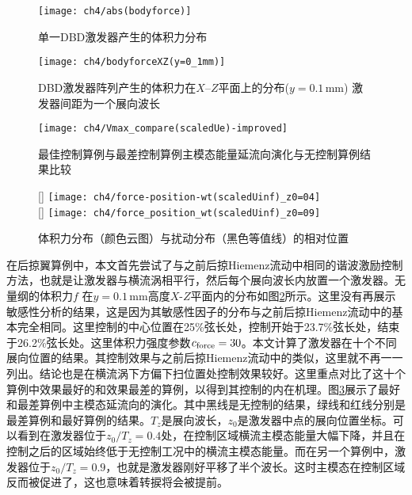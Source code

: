 \begin{figure}[htb]
\centering
  \texttt{[image: ch4/abs(bodyforce)]}
  \caption{单一DBD激发器产生的体积力分布}%
  \label{f:forceshape}
\end{figure}

\begin{figure}[htb]
\centering
  \texttt{[image: ch4/bodyforceXZ(y=0\_1mm)]}
  \caption{DBD激发器阵列产生的体积力在$X$--$Z$平面上的分布($y= 0.1$\,mm) 激发器间距为一个展向波长}%
  \label{f:force_XZ_1perwavelength}
\end{figure}

\begin{figure}[htb]
\centering
  \texttt{[image: ch4/Vmax\_compare(scaledUe)-improved]}
  \caption{最佳控制算例与最差控制算例主模态能量延流向演化与无控制算例结果比较}%
  \label{f:bestworst}
\end{figure}
\begin{figure}[htb]
\centering
  [\textwidth]
  {\texttt{[image: ch4/force-position-wt(scaledUinf)\_z0=04]}
}
  \\\bigskip
  [\textwidth]
  {
  \texttt{[image: ch4/force\_position\_wt(scaledUinf)\_z0=09]}
  }
  \caption{体积力分布（颜色云图）与扰动分布（黑色等值线）的相对位置}
  \label{f:pla_postion}
\end{figure}

在后掠翼算例中，本文首先尝试了与之前后掠Hiemenz流动中相同的谐波激励控制方法，也就是让激发器与横流涡相平行，然后每个展向波长内放置一个激发器。无量纲的体积力$f$ 在$y=0.1$\,mm高度$X$-$Z$平面内的分布如图\ref{f:force_XZ_1perwavelength}所示。这里没有再展示敏感性分析的结果，这是因为其敏感性因子的分布与之前后掠Hiemenz流动中的基本完全相同。这里控制的中心位置在25\%弦长处，控制开始于23.7\%弦长处，结束于26.2\%弦长处。这里体积力强度参数$c_{\rm force}= 30$。本文计算了激发器在十个不同展向位置的结果。其控制效果与之前后掠Hiemenz流动中的类似，这里就不再一一列出。结论也是在横流涡下方偏下扫位置处控制效果较好。这里重点对比了这十个算例中效果最好的和效果最差的算例，以得到其控制的内在机理。图\ref{f:bestworst}展示了最好和最差算例中主模态延流向的演化。其中黑线是无控制的结果，绿线和红线分别是最差算例和最好算例的结果。$T_z$是展向波长，$z_0$是激发器中点的展向位置坐标。可以看到在激发器位于$z_0/T_z=0.4$处，在控制区域横流主模态能量大幅下降，并且在控制之后的区域始终低于无控制工况中的横流主模态能量。而在另一个算例中，激发器位于$z_0/T_z=0.9$，也就是激发器刚好平移了半个波长。这时主模态在控制区域反而被促进了，这也意味着转捩将会被提前。

